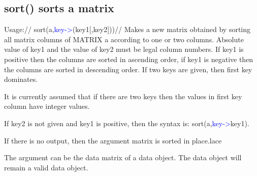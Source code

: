 \subsection{\textcolor{VioletRed}{sort}() sorts a matrix}
\label{sort}
Usage://
\textcolor{VioletRed}{sort}(a,\textcolor{blue}{key->}(key1[,key2]))//
Makes a new matrix obtained by sorting all matrix columns of MATRIX a according to one or two columns.
Absolute value of key1 and the value of key2 must be legal column numbers.
If key1 is
positive then the columns are sorted in ascending order,
if key1 is negative then the columns
are sorted in descending order. If two keys are given, then first key dominates.
\begin{note}
It is currently
assumed that if there are two keys then the values in first key column have integer values.
\end{note}
\begin{note}
If key2 is not given and key1 is positive, then the syntax is: \textcolor{VioletRed}{sort}(a,\textcolor{blue}{key->}key1).
\end{note}
\begin{note}
If there is no output, then the argument matrix is sorted in place.lace
\end{note}
\begin{note}
The argument can be the data matrix of a data object. The data object will remain a
valid data object.
\end{note}
